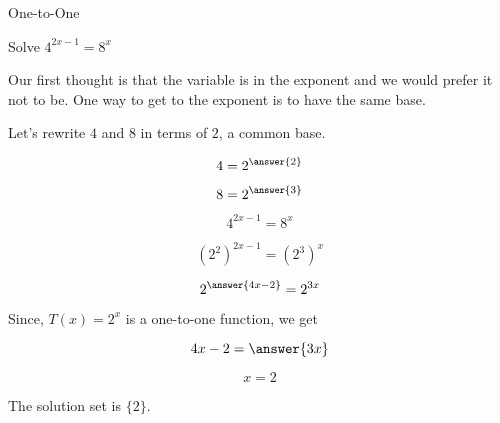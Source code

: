 \documentclass{ximera}
\begin{document}
\begin{example} One-to-One


Solve $4^{2x-1} = 8^x$



\begin{explanation}

Our first thought is that the variable is in the exponent and we would prefer it not to be.  One way to get to the exponent is to have the same base.

Let's rewrite $4$ and $8$ in terms of $2$, a common base.

\[  4 = 2^{\answer{2}} \]

\[  8 = 2^{\answer{3}} \]



\[  4^{2x-1} = 8^x  \]

\[  (2^2)^{2x-1} = (2^3)^x  \]

\[  2^{\answer{4x-2}} = 2^{3x}  \]


Since, $T(x) = 2^x$ is a one-to-one function, we get


\[  4x-2  = \answer{3x}   \]


\[ x = 2 \]

The solution set is $\{ 2 \}$.


\end{explanation}
\end{example}
\end{document}
